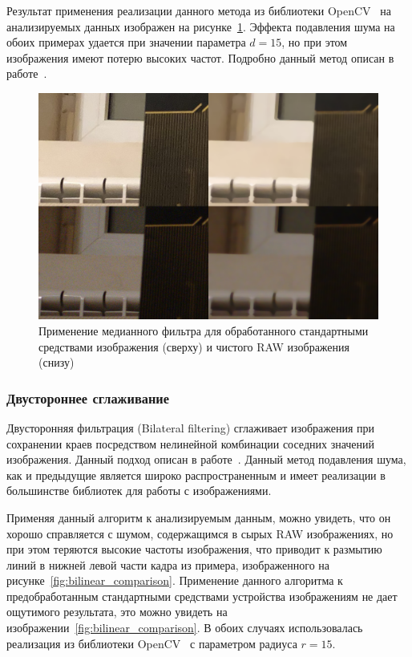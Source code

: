 Результат применения реализации данного метода из библиотеки OpenCV~\autocite{OpenCVLib} на анализируемых данных изображен на рисунке~\ref{fig:medianblur_comparison}. Эффекта подавления шума на обоих примерах удается при значении параметра $d = 15$, но при этом изображения имеют потерю высоких частот. Подробно данный метод описан в работе~\autocite{MedianBluPaper}. 

\begin{figure}[h]
	\centering
	\includegraphics[width=\textwidth]{img/medianfilter_comparison}
	\caption{Применение медианного фильтра для обработанного стандартными средствами изображения (сверху) и чистого RAW изображения (снизу)}
	\label{fig:medianblur_comparison}
\end{figure}

\subsubsection{Двустороннее сглаживание}
Двусторонняя фильтрация (Bilateral filtering) сглаживает изображения при сохранении краев посредством нелинейной комбинации соседних значений изображения. Данный подход описан в работе~\autocite{BilateralPaper}. Данный метод подавления шума, как и предыдущие является широко распространенным и имеет реализации в большинстве библиотек для работы с изображениями. 

Применяя данный алгоритм к анализируемым данным, можно увидеть, что он хорошо справляется с шумом, содержащимся в сырых RAW изображениях, но при этом теряются высокие частоты изображения, что приводит к размытию линий в нижней левой части кадра из примера, изображенного на рисунке~\ref{fig:bilinear_comparison}. Применение данного алгоритма к предобработанным стандартными средствами устройства изображениям не дает ощутимого результата, это можно увидеть на изображении~\ref{fig:bilinear_comparison}. В обоих случаях использовалась реализация из библиотеки OpenCV~\autocite{OpenCVLib} с параметром радиуса $r = 15$.


